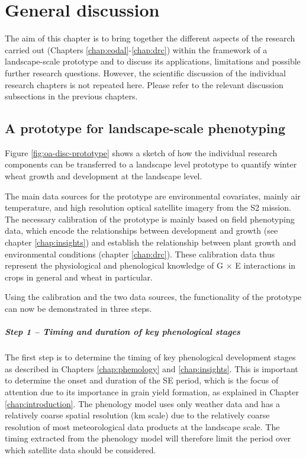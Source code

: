\chapter{General discussion}
\label{chap:general-discussion}

The aim of this chapter is to bring together the different aspects of the research carried out (Chapters \ref{chap:eodal}-\ref{chap:drc}) within the framework of a landscape-scale prototype and to discuss its applications, limitations and possible further research questions. However, the scientific discussion of the individual research chapters is not repeated here. Please refer to the relevant discussion subsections in the previous chapters.

\section{A prototype for landscape-scale phenotyping}
Figure \ref{fig:oa-disc-prototype} shows a sketch of how the individual research components can be transferred to a landscape level prototype to quantify winter wheat growth and development at the landscape level.

The main data sources for the prototype are environmental covariates, mainly air temperature, and high resolution optical satellite imagery from the \gls{S2} mission. The necessary calibration of the prototype is mainly based on field phenotyping data, which encode the relationships between development and growth (see chapter \ref{chap:insights}) and establish the relationship between plant growth and environmental conditions (chapter \ref{chap:drc}). These calibration data thus represent the physiological and phenological knowledge of G $\times$ E interactions in crops in general and wheat in particular.

Using the calibration and the two data sources, the functionality of the prototype can now be demonstrated in three steps.

\paragraph{Step 1 -- Timing and duration of key phenological stages}
The first step is to determine the timing of key phenological development stages as described in Chapters \ref{chap:phemology} and \ref{chap:insights}. This is important to determine the onset and duration of the \gls{SE} period, which is the focus of attention due to its importance in grain yield formation, as explained in Chapter \ref{chap:introduction}. The phenology model uses only weather data and has a relatively coarse spatial resolution (km scale) due to the relatively coarse resolution of most meteorological data products at the landscape scale. The timing extracted from the phenology model will therefore limit the period over which satellite data should be considered.

